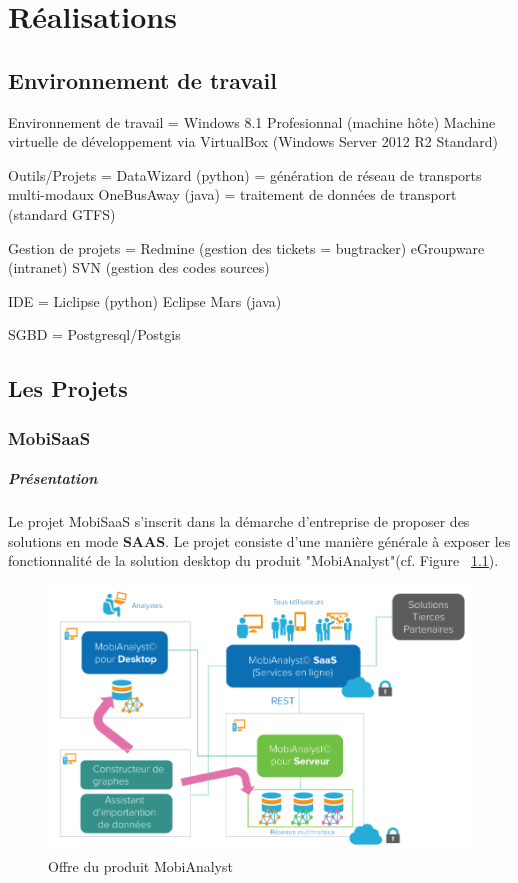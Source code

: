 \chapter{Réalisations}
\label{AnalyseConception}

\section{Environnement de travail}
Environnement de travail =
Windows 8.1 Profesionnal (machine hôte)
Machine virtuelle de développement via VirtualBox (Windows Server 2012 R2 Standard)

Outils/Projets =
DataWizard (python) = génération de réseau de transports multi-modaux
OneBusAway (java) = traitement de données de transport (standard GTFS)

Gestion de projets =
Redmine (gestion des tickets = bugtracker)
eGroupware (intranet)
SVN (gestion des codes sources)

IDE =
    Liclipse (python)
    Eclipse Mars (java)

SGBD = 
Postgresql/Postgis

\section{Les Projets}

\subsection{MobiSaaS}

\paragraph{Présentation}

Le projet MobiSaaS s'inscrit dans la démarche d'entreprise de proposer des solutions en mode \textbf{SAAS}. Le projet consiste d'une manière générale à exposer les fonctionnalité de la solution desktop du produit "MobiAnalyst"(cf. Figure ~\ref{fig:Offre du produit MobiAnalyst}).
\begin{figure}[!h]\label{fig:Offre du produit MobiAnalyst}
\centering
\includegraphics[width=12cm]{images/offre_MobiAnalyst.png}
\caption{Offre du produit MobiAnalyst}
\end{figure} 

